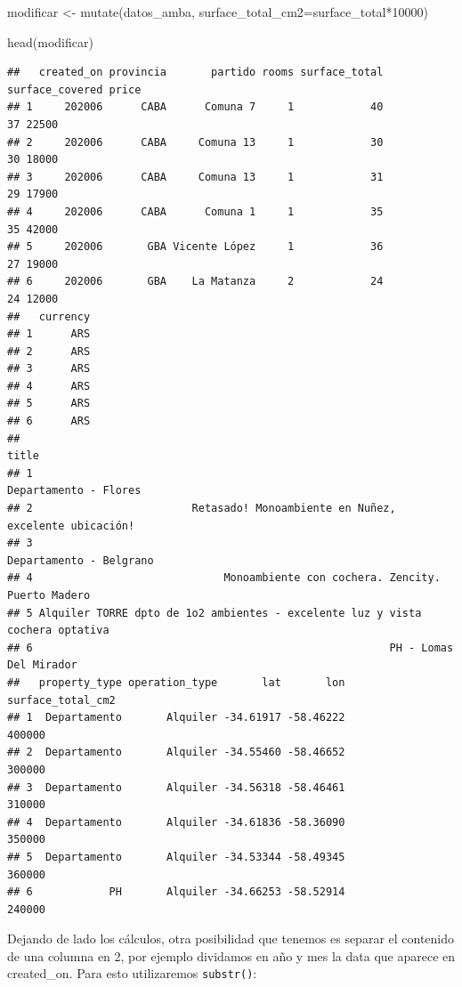 \documentclass[
  spanish,
]{book}
\newenvironment{Shaded}{\begin{snugshade}}{\end{snugshade}}
\newcommand{\AttributeTok}[1]{\textcolor[rgb]{0.77,0.63,0.00}{#1}}
\newcommand{\DecValTok}[1]{\textcolor[rgb]{0.00,0.00,0.81}{#1}}
\newcommand{\FunctionTok}[1]{\textcolor[rgb]{0.00,0.00,0.00}{#1}}
\newcommand{\NormalTok}[1]{#1}
\newcommand{\OtherTok}[1]{\textcolor[rgb]{0.56,0.35,0.01}{#1}}
\newcommand{\SpecialCharTok}[1]{\textcolor[rgb]{0.00,0.00,0.00}{#1}}
\begin{document}
\begin{Shaded}
\begin{Highlighting}[]
\NormalTok{modificar }\OtherTok{\textless{}{-}} \FunctionTok{mutate}\NormalTok{(datos\_amba, }\AttributeTok{surface\_total\_cm2=}\NormalTok{surface\_total}\SpecialCharTok{*}\DecValTok{10000}\NormalTok{)}

\FunctionTok{head}\NormalTok{(modificar)}
\end{Highlighting}
\end{Shaded}

\begin{verbatim}
##   created_on provincia       partido rooms surface_total surface_covered price
## 1     202006      CABA      Comuna 7     1            40              37 22500
## 2     202006      CABA     Comuna 13     1            30              30 18000
## 3     202006      CABA     Comuna 13     1            31              29 17900
## 4     202006      CABA      Comuna 1     1            35              35 42000
## 5     202006       GBA Vicente López     1            36              27 19000
## 6     202006       GBA    La Matanza     2            24              24 12000
##   currency
## 1      ARS
## 2      ARS
## 3      ARS
## 4      ARS
## 5      ARS
## 6      ARS
##                                                                           title
## 1                                                         Departamento - Flores
## 2                         Retasado! Monoambiente en Nuñez, excelente ubicación!
## 3                                                       Departamento - Belgrano
## 4                              Monoambiente con cochera. Zencity. Puerto Madero
## 5 Alquiler TORRE dpto de 1o2 ambientes - excelente luz y vista cochera optativa
## 6                                                        PH - Lomas Del Mirador
##   property_type operation_type       lat       lon surface_total_cm2
## 1  Departamento       Alquiler -34.61917 -58.46222            400000
## 2  Departamento       Alquiler -34.55460 -58.46652            300000
## 3  Departamento       Alquiler -34.56318 -58.46461            310000
## 4  Departamento       Alquiler -34.61836 -58.36090            350000
## 5  Departamento       Alquiler -34.53344 -58.49345            360000
## 6            PH       Alquiler -34.66253 -58.52914            240000
\end{verbatim}

Dejando de lado los cálculos, otra posibilidad que tenemos es separar el contenido de una columna en 2, por ejemplo dividamos en año y mes la data que aparece en created\_on. Para esto utilizaremos \texttt{substr()}:
\end{document}
